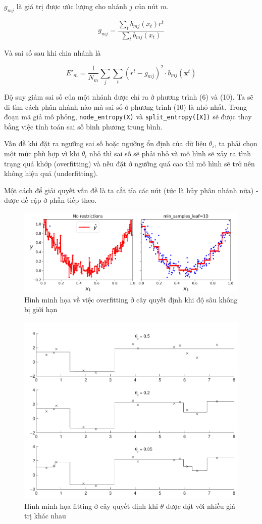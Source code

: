$g_{mj}$ là giá trị được ước lượng cho nhánh $j$ của nút $m$.

\begin{equation} g_{mj} = \frac{\sum_t {b_{mj} (x_t)r^t}}{\sum_t {b_{mj} (x_t)}} \end{equation}

Và sai số sau khi chia nhánh là

\begin{equation} E'_m = \frac{1}{N_m}\sum_j \sum_t{(r^t - g_{mj})^2 \cdot b_{mj}(\mathbf{x}^t)} \end{equation}

Độ suy giảm sai số của một nhánh được chỉ ra ở phương trình (6) và (10). Ta sẽ đi tìm cách phân nhánh nào mà sai số ở phương trình (10) là nhỏ nhất. Trong đoạn mã giả mô phỏng, \texttt{node\_entropy(X)} và \texttt{split\_entropy([X])} sẽ được thay bằng việc tính toán sai số bình phương trung bình.

Vấn đề khi đặt ra ngưỡng sai số hoặc ngưỡng ổn định của dữ liệu $\theta_i$, ta phải chọn một mức phù hợp vì khi $\theta_i$ nhỏ thì sai số sẽ phải nhỏ và mô hình sẽ xảy ra tình trạng quá khớp (overfitting) và nếu đặt ở ngưỡng quá cao thì mô hình sẽ trở nên không hiệu quả (underfitting).

Một cách để giải quyết vấn đề là ta cắt tỉa các nút (tức là hủy phân nhánh nữa) - được đề cập ở phần tiếp theo.
\begin{figure}
    \centering
    \includegraphics[width=\linewidth]{figures/dt_overfit1.png}
    \caption{Hình minh họa về việc overfitting ở cây quyết định khi độ sâu không bị giới hạn}
    \label{fig:dt_overfit1}
\end{figure}
\begin{figure}
    \centering
    \includegraphics[width=0.7\linewidth]{figures/dt_overfit2.png}
    \caption{Hình minh họa fitting ở cây quyết định khi $\theta$ được đặt với nhiều giá trị khác nhau}
    \label{fig:dt_overfit2}
\end{figure}

